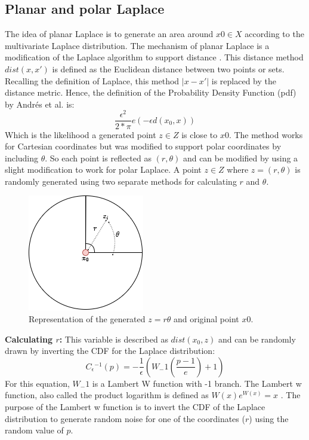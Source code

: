 \subsection{Planar and polar Laplace}
The idea of planar Laplace is to generate an area around $x0 \in X$ according to the multivariate Laplace distribution.
The mechanism of planar Laplace is a modification of the Laplace algorithm to support distance \citep{DBLP:journals/corr/abs-1212-1984}.
This distance method $dist(x, x')$ is defined as the Euclidean distance between two points or sets.
Recalling the definition of Laplace, this method $|x-x'|$ is replaced by the distance metric.
Hence, the definition of the Probability Density Function (pdf) by Andrés et al. is:
\begin{equation}
  \frac{\epsilon^2}{2*\pi}e(-\epsilon d(x_0, x))
\end{equation}
Which is the likelihood a generated point $z \in Z$ is close to $x0$.
The method works for Cartesian coordinates but was modified to support polar coordinates by including $\theta$.
So each point is reflected as $(r, \theta)$ and can be modified by using a slight modification to work for polar Laplace.
A point $z \in Z$ where $z = (r, \theta)$ is randomly generated using two separate methods for calculating $r$ and $\theta$.
\begin{figure}[h]
  \includegraphics[scale=0.6]{TheorethicalFramework/ND-Laplace/Images/polar-laplace.png}
  \centering
  \caption{Representation of the generated $z = {r \theta}$ and original point $x0$.}
  \label{figure:parea}
\end{figure}

\textbf{Calculating $r$:}
This variable is described as $dist(x_0, z)$ and can be randomly drawn by inverting the CDF for the Laplace distribution:
\begin{equation}
  C{_\epsilon}{^{-1}}(p) = - \frac{1}{\epsilon}(W_-1 (\frac{p - 1}{e}) + 1)
\end{equation}
For this equation, $W_-1$ is a Lambert W function with -1 branch.
The Lambert w function, also called the product logarithm is defined as $W(x)e^{W(x)} = x$ \citep{lehtonen_lambert_2016}.
The purpose of the Lambert w function is to invert the CDF of the Laplace distribution to generate random noise for one of the coordinates ($r$) using the random value of $p$.

